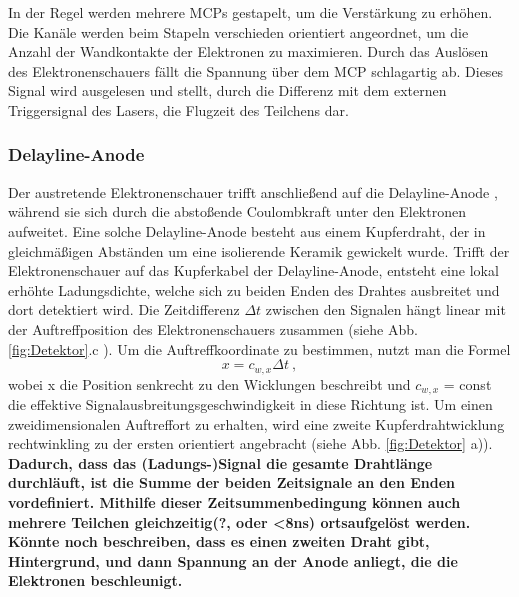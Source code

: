 In der Regel werden mehrere MCPs gestapelt, um die Verstärkung zu erhöhen. Die Kanäle werden beim Stapeln verschieden orientiert angeordnet, um die Anzahl der Wandkontakte der Elektronen zu maximieren. %
Durch das Auslösen des Elektronenschauers fällt die Spannung über dem MCP schlagartig ab. Dieses Signal wird ausgelesen und stellt, durch die Differenz mit dem externen Triggersignal des Lasers, die Flugzeit des Teilchens dar. 



\subsubsection{Delayline-Anode}

Der austretende Elektronenschauer trifft anschließend auf die Delayline-Anode \cite{sobottka1988}, während sie sich durch die abstoßende Coulombkraft unter den Elektronen aufweitet. Eine solche Delayline-Anode besteht aus einem Kupferdraht, der in gleichmäßigen Abständen um eine isolierende Keramik gewickelt wurde. Trifft der Elektronenschauer auf das Kupferkabel der Delayline-Anode, entsteht eine lokal erhöhte Ladungsdichte, welche sich zu beiden Enden des Drahtes ausbreitet und dort detektiert wird. Die Zeitdifferenz $\Delta t$ zwischen den Signalen hängt linear mit der Auftreffposition des Elektronenschauers zusammen (siehe Abb. \ref{fig:Detektor}.c ). Um die Auftreffkoordinate zu bestimmen, nutzt man die Formel
\begin{equation}
x = c_{w,x} \Delta t\ ,
\end{equation}
wobei x die Position senkrecht zu den Wicklungen beschreibt und $c_{w,x}$ = const die effektive Signalausbreitungsgeschwindigkeit in diese Richtung ist. Um einen zweidimensionalen Auftreffort zu erhalten, wird eine zweite Kupferdrahtwicklung rechtwinkling zu der ersten orientiert angebracht (siehe Abb. \ref{fig:Detektor} a)). \textbf{Dadurch, dass das (Ladungs-)Signal die gesamte Drahtlänge durchläuft, ist die Summe der beiden Zeitsignale an den Enden vordefiniert. Mithilfe dieser Zeitsummenbedingung können auch mehrere Teilchen gleichzeitig(?, oder <8ns) ortsaufgelöst werden.}\\
\textbf{Könnte noch beschreiben, dass es einen zweiten Draht gibt, Hintergrund, und dann Spannung an der Anode anliegt, die die Elektronen beschleunigt.}

